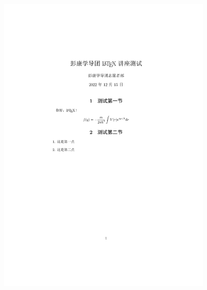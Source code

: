 \begin{frame}[fragile]
\begin{columns}
\begin{column}{0.48\textwidth}
\begin{lstlisting}
  \end{lstlisting}
    \end{column}
    \begin{column}{0.48\textwidth}
      \begin{figure}
        \centering
        \vspace{-0.8cm}
        \includegraphics[width=\textwidth]{figures/test1.pdf}
      \end{figure}
    \end{column}
  \end{columns}
\end{frame}